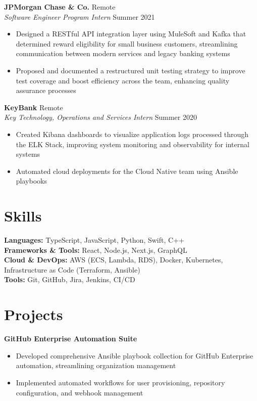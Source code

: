 \documentclass[11pt,a4paper]{article}
\newcommand{\sectionspace}{\vspace{1mm}}
\begin{document}
\noindent \textbf{JPMorgan Chase \& Co.} \hfill Remote\\
\textit{Software Engineer Program Intern} \hfill Summer 2021
\begin{itemize}
	\item Designed a RESTful API integration layer using MuleSoft and Kafka that determined reward eligibility for small business customers, streamlining communication between modern services and legacy banking systems
	\item Proposed and documented a restructured unit testing strategy to improve test coverage and boost efficiency across the team, enhancing quality assurance processes
\end{itemize}

\noindent \textbf{KeyBank} \hfill Remote\\
\textit{Key Technology, Operations and Services Intern} \hfill Summer 2020
\begin{itemize}
	\item Created Kibana dashboards to visualize application logs processed through the ELK Stack, improving system monitoring and observability for internal systems
	\item Automated cloud deployments for the Cloud Native team using Ansible playbooks
\end{itemize}

\section{Skills}
\sectionspace
\textbf{Languages:} TypeScript, JavaScript, Python, Swift, C++\\
\textbf{Frameworks \& Tools:} React, Node.js, Next.js, GraphQL\\
\textbf{Cloud \& DevOps:} AWS (ECS, Lambda, RDS), Docker, Kubernetes, Infrastructure as Code (Terraform, Ansible)\\
\textbf{Tools:} Git, GitHub, Jira, Jenkins, CI/CD

\section{Projects}
\sectionspace
\textbf{GitHub Enterprise Automation Suite} 
\begin{itemize}
	\item Developed comprehensive Ansible playbook collection for GitHub Enterprise automation, streamlining organization management
	\item Implemented automated workflows for user provisioning, repository configuration, and webhook management
\end{itemize}
\end{document}
